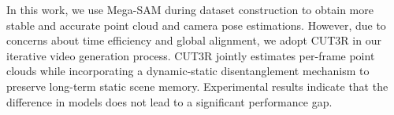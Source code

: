 In this work, we use Mega-SAM during dataset construction to obtain more stable and accurate point cloud and camera pose estimations. However, due to concerns about time efficiency and global alignment, we adopt CUT3R in our iterative video generation process. CUT3R jointly estimates per-frame point clouds while incorporating a dynamic-static disentanglement mechanism to preserve long-term static scene memory. Experimental results indicate that the difference in models does not lead to a significant performance gap.
